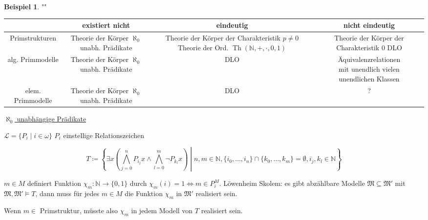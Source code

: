 \documentclass[12pt,parskip=full]{scrartcl}
\newcommand{\setN}{\mathbb{N}}
\newcommand{\heading}{\underline}
\theoremstyle{definition}
\newtheorem{example}[theorem]{Beispiel}
\begin{document}
	\begin{example}""
		
		\begin{tabular}{|c|c|c|c|}
			\hline 
			& existiert nicht & eindeutig & nicht eindeutig \\ 
			\hline 
			Primstrukturen & \shortstack{Theorie der Körper \\ \\ $\aleph_0$ unabh. Prädikate}  & \shortstack{Theorie der Körper \\ der Charakteristik \\ $p \neq 0$ \\ \\ Theorie der Ord. \\ \\ $\operatorname{Th}(\setN, +, \cdot, 0, 1)$} & \shortstack{Theorie der Körper \\ der Charakteristik $0$ \\ \\ DLO} \\ 
			\hline 
			alg. Primmodelle & \shortstack{Theorie der Körper \\ \\ $\aleph_0$ unabh. Prädikate} & DLO & \shortstack{Äquivalenzrelationen \\ mit unendlich vielen \\ unendlichen Klassen} \\ 
			\hline 
			elem. Primmodelle & \shortstack{Theorie der Körper \\ \\ $\aleph_0$ unabh. Prädikate} & DLO & ? \\ 
			\hline 
		\end{tabular}
	
		\heading{$\aleph_0$ unabhängige Prädikate}
		
		$\mathcal{L} = \{ P_i \mid i \in \omega \}$ $P_i$ einstellige Relationszeichen
		
		\begin{equation*}
			T \coloneqq \left\{ \exists x \left( \bigwedge_{j=0}^n P_{i_j} x \land \bigwedge_{l=0}^m \lnot P_{k_l} x \right) \middle| n,m \in \setN, \{i_0, \dots, i_n \} \cap \{ k_0, \dots, k_m \} = \emptyset, i_j, k_l \in \setN  \right\}
		\end{equation*}
		
		$m \in M$ definiert Funktion $\chi_m: \setN \to \{ 0,1 \}$ durch $\chi_m(i) = 1 \Leftrightarrow m \in P_i^M$. Löwenheim Skolem: es gibt abzählbare Modelle $\mathfrak{M} \subseteq \mathfrak{M}'$ mit $\mathfrak{M}, \mathfrak{M}' \models T$, dann muss für jedes $m \in M$ die Funktion $\chi_m$ in $\mathfrak{M}'$ realisiert sein.
		
		Wenn $m \in$ Primstruktur, müsste also $\chi_m$ in jedem Modell von $T$ realisiert sein.	
	\end{example}
\end{document}
